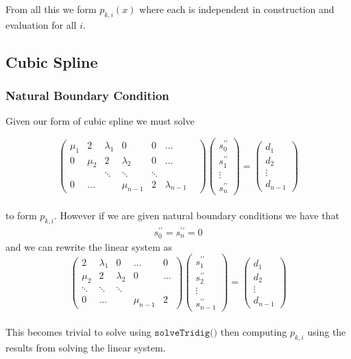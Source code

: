 \documentclass[12pt]{article}
\theoremstyle{remark}
\begin{document}
From all this we form $p_{k,i}(x)$ where each is independent in construction and evaluation for all $i$. 

\subsection{Cubic Spline}

\subsubsection{Natural Boundary Condition}
Given our form of cubic spline we must solve

$$
\begin{pmatrix}
\mu_1 & 2 & \lambda_1 & 0 & 0 &\ldots &  \\
0 & \mu_2 & 2 & \lambda_2 & 0 & \ldots \\
& & \ddots & \ddots & \ddots & \\
0 & \ldots & & \mu_{n-1} & 2 & \lambda_{n-1}
\end{pmatrix}
\begin{pmatrix}
s^{\prime\prime}_0 \\
s^{\prime\prime}_1 \\ 
\vdots \\
s^{\prime\prime}_n
\end{pmatrix}
=
\begin{pmatrix}
d_1 \\
d_2 \\
\vdots \\
d_{n-1}
\end{pmatrix}
$$ \\

to form $p_{k,i}$. However if we are given natural boundary conditions we have that 
\begin{align*}
	s^{\prime\prime}_0 = s^{\prime\prime}_n = 0
\end{align*}
and we can rewrite the linear system as 
$$ 
\begin{pmatrix}
2 & \lambda_1 & 0 & \ldots & 0 \\
\mu_2 & 2 & \lambda_2 & 0 & \ldots \\
\ddots & \ddots & \ddots & & \\
0 &\ldots & & \mu_{n-1} & 2 
\end{pmatrix} 
\begin{pmatrix}
 s^{\prime\prime}_1 \\
 s^{\prime\prime}_2 \\
 \vdots \\
 s^{\prime\prime}_{n-1}
\end{pmatrix} 
=
\begin{pmatrix}
d_1 \\
d_2 \\
\vdots \\
d_{n-1}
\end{pmatrix}
$$ \\ 
This becomes trivial to solve using $\texttt{solveTridig()}$ then computing $p_{k,i}$ using the results from solving the linear system. 
\end{document}
